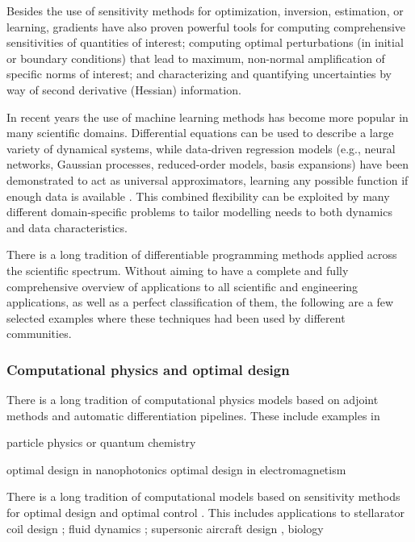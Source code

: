 Besides the use of sensitivity methods for optimization, inversion, estimation, or learning, gradients have also proven powerful tools for computing comprehensive sensitivities of quantities of interest; computing optimal perturbations (in initial or boundary conditions) that lead to maximum, non-normal amplification of specific norms of interest; and characterizing and quantifying uncertainties by way of second derivative (Hessian) information.

In recent years the use of machine learning methods has become more popular in many scientific domains. 
Differential equations can be used to describe a large variety of dynamical systems, while data-driven regression models (e.g., neural networks, Gaussian processes, reduced-order models, basis expansions) have been demonstrated to act as universal approximators, learning any possible function if enough data is available \cite{gorban_1998}. 
This combined flexibility can be exploited by many different domain-specific problems to tailor modelling needs to both dynamics and data characteristics.

There is a long tradition of differentiable programming methods applied across the scientific spectrum. 
Without aiming to have a complete and fully comprehensive overview of applications to all scientific and engineering applications, as well as a perfect classification of them, the following are a few selected examples where these techniques had been used by different communities. 

\subsubsection{Computational physics and optimal design}

There is a long tradition of computational physics models based on adjoint methods and automatic differentiation pipelines. 
These include examples in 

particle physics \cite{Dorigo.2022} or quantum chemistry \cite{Arrazola.2021}

optimal design in nanophotonics \cite{Molesky_Lin_Piggott_Jin_Vucković_Rodriguez_2018}
optimal design in electromagnetism \cite{Georgieva_Glavic_Bakr_Bandler_2002}


There is a long tradition of computational models based on sensitivity methods for optimal design and optimal control \cite{lions1971optimal, pironneau2005optimal, allaire2014shape}.
This includes applications to 
stellarator coil design \cite{McGreivy_stellarator_2021}; 
fluid dynamics \cite{Giles_Pierce_2000, mohammadi2009applied};
supersonic aircraft design \cite{
hu2010supersonic, fike2013multi}, biology \cite{Strouwen2022}

